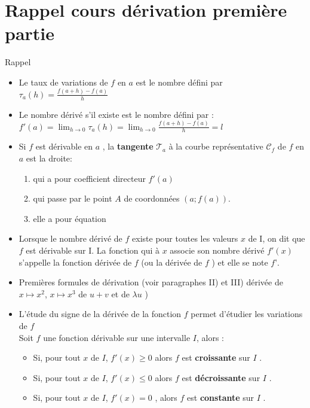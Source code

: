 \documentclass[11pt,a4paper]{article}
\theoremstyle{break}
\begin{document}
	
	\begin{center}
		\shadowbox{\begin{large}
				\textcolor{black}{DÉRIVÉE : Deuxième partie}
			\end{large}}
		\end{center}
	\tableofcontents

\section{Rappel cours dérivation première partie}
	\begin{bclogo}[couleur = yellow!30, arrondi = 0.1,logo=\bcbook]{Rappel}
		\begin{itemize}
			\item \boldmath	Le {taux de variations} de $f$ en $a$  est le nombre défini par 
				$\tau_a(h)=\frac{f(a+h)-f(a)}{h}$
			\item Le nombre dérivé s'il existe est le nombre défini par  :$ f'(a)=\displaystyle\lim_{h\to0}\tau_a(h)=\displaystyle\lim_{h\to0}\frac{f(a+h)-f(a)}{h}=l $
			\item 	Si $f$ est dérivable en $a$ , la \textbf{tangente} $\mathscr{T}_a$ à la courbe représentative $\mathscr{C}_f$ de $f$ en $a$ est la droite:\begin{enumerate}
				\item qui a pour coefficient directeur $f'(a)$
				\item qui passe par le point $A$ de coordonnées $(a;f(a))$.
				\item elle a pour équation 
			\end{enumerate}
		\item Lorsque le nombre dérivé de $f$ existe pour toutes les valeurs $x$ de I, on dit que $f$ est dérivable sur I.
		La fonction qui à $x$ associe son nombre dérivé $f'(x)$ s’appelle la fonction dérivée de $f$ (ou la dérivée
		de $f$ ) et elle se note $f’$.
		\item Premières formules de dérivation (voir paragraphes II) et III) dérivée de $x\mapsto x^2$, $x\mapsto x^3$ de $u+v$ et de $\lambda u$ )
\item L'étude du signe de la dérivée de la fonction $f$ permet d'étudier les variations de $f$\\
Soit $f$ une fonction dérivable sur une intervalle  $I$, alors :
\begin{itemize}
	\item Si, pour tout $x$ de $I$, $f'(x)  \geq 0 $  alors $f$ est \textbf{ croissante} sur $I$ .
	\item Si, pour tout $x$ de $I$, $f'(x) \leq 0 $  alors $f$ est \textbf{ décroissante} sur $I$ .
	\item Si, pour tout $x$ de $I$, $f'(x) = 0 $ , alors $f$ est \textbf{ constante } sur $I$ .
\end{itemize} 
		\end{itemize}
	\end{bclogo}
\newpage
\end{document}
